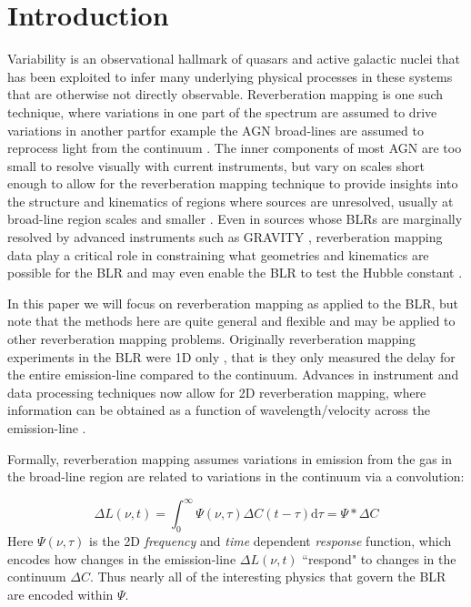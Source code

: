 \documentclass[floatfix,twocolumn,trackchanges,linenumbers]{aastex7}
\begin{document}
\section{Introduction}\label{sec:intro}
Variability is an observational hallmark of quasars and active galactic nuclei that has been exploited to infer many underlying physical processes in these systems that are otherwise not directly observable. Reverberation mapping is one such technique, where variations in one part of the spectrum are assumed to drive variations in another part\textemdash for example the AGN broad-lines are assumed to reprocess light from the continuum \citep{BLANDFORD_MCKEE_82}. The inner components of most AGN are too small to resolve visually with current instruments, but vary on scales short enough to allow for the reverberation mapping technique to provide insights into the structure and kinematics of regions where sources are unresolved, usually at broad-line region scales and smaller \citep{RM_Review_21,Peterson93_RM}. Even in sources whose BLRs are marginally resolved by advanced instruments such as GRAVITY \citep{GRAVITY19,GRAVITY+}, reverberation mapping data play a critical role in constraining what geometries and kinematics are possible for the BLR \citep{Long_2025,STORM_MODEL_SPECTRA,STORM_ECHO,STORM_CLOUDS} and may even enable the BLR to test the Hubble constant \citep{RM3c27319,Watson2011_RM_AGN_cosmological_distance}. 

In this paper we will focus on reverberation mapping as applied to the BLR, but note that the methods here are quite general and flexible and may be applied to other reverberation mapping problems. Originally reverberation mapping experiments in the BLR were 1D only \citep[i.e. see][for older reverberation results in NGC 5548]{KORISTA_95_NGC5548_RM, Krolik1991_NGC_5548,HorneWelshPeterson1991_EchoMapping_NGC5548}, that is they only measured the delay for the entire emission-line compared to the continuum. Advances in instrument and data processing techniques now allow for 2D reverberation mapping, where information can be obtained as a function of wavelength/velocity across the emission-line \citep{Welsh&Horne_EchoMaps, STORM_ECHO}. 

Formally, reverberation mapping assumes variations in emission from the gas in the broad-line region are related to variations in the continuum via a convolution:

\begin{equation}\label{variabilityEqn}
\Delta L(\nu,t) = \int_0^\infty \Psi(\nu,\tau)\Delta C(t-\tau)\mathrm{d}\tau = \Psi*\Delta C
\end{equation}
Here $\Psi(\nu,\tau)$ is the 2D \textit{frequency} and \textit{time} dependent \textit{response} function, which encodes how changes in the emission-line $\Delta L(\nu,t)$ ``respond" to changes in the continuum $\Delta C$. Thus nearly all of the interesting physics that govern the BLR are encoded within $\Psi$. 
\end{document}
